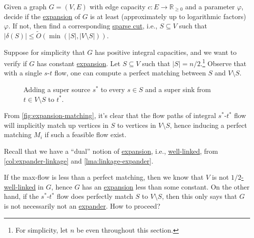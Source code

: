 \begin{problem*}
	Given a graph \(G = (V, E)\) with edge capacity \(c\colon E \to \mathbb{R} _{\geq 0}\)  and a parameter \(\varphi \), decide if the \hyperref[def:expansion]{expansion} of \(G\) is at least (approximately up to logarithmic factors) \(\varphi \). If not, then find a corresponding \hyperref[prb:sparsest-cut]{sparse cut}, i.e., \(S \subseteq V\) such that \(\lvert \delta (S) \rvert \leq \widetilde{O} (\min (\lvert S \rvert , \lvert V \setminus S \rvert ))\).
\end{problem*}

Suppose for simplicity that \(G\) has positive integral capacities, and we want to verify if \(G\) has constant \hyperref[def:expansion]{expansion}. Let \(S \subseteq V\) such that \(\lvert S \rvert = n / 2\).\footnote{For simplicity, let \(n\) be even throughout this section.} Observe that with a single \(s\)-\(t\) flow, one can compute a perfect matching between \(S\) and \(V\setminus S\).

\begin{center}
	\begin{figure}[H]
		\centering
		\caption{Adding a super source \(s^{\ast} \) to every \(s \in S\) and a super sink from \(t \in V\setminus S\) to \(t^{\ast} \). }
		\label{fig:expansion-matching}
	\end{figure}
\end{center}

From \autoref{fig:expansion-matching}, it's clear that the flow paths of integral \(s^{\ast} \)-\(t^{\ast} \) flow will implicitly match up vertices in \(S\) to vertices in \(V\setminus S\), hence inducing a perfect matching \(M_i\) if such a feasible flow exist.

\begin{prev}
	Recall that we have a ``dual'' notion of \hyperref[def:expansion]{expansion}, i.e., \hyperref[def:linkage]{well-linked}, from \autoref{col:expander-linkage} and \autoref{lma:linkage-expander}.
\end{prev}

If the max-flow is less than a perfect matching, then we know that \(V\) is not \hyperref[def:well-linked]{\(1 / 2\)-well-linked} in \(G\), hence \(G\) has an \hyperref[def:expansion]{expansion} less than some constant. On the other hand, if the \(s^{\ast} \)-\(t^{\ast} \) flow does perfectly match \(S\) to \(V\setminus S\), then this only says that \(G\) is not necessarily not an \hyperref[def:expander]{expander}. How to proceed?

